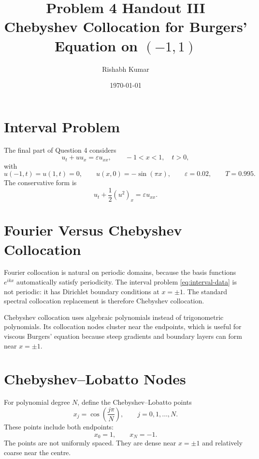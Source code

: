 \documentclass[11pt]{article}
\title{Problem 4 Handout III\\Chebyshev Collocation for Burgers' Equation on $(-1,1)$}
\author{Rishabh Kumar}
\date{\today}
\begin{document}
\maketitle

\section{Interval Problem}

The final part of Question 4 considers
\begin{equation}
    u_t+u u_x=\varepsilon u_{xx},
    \qquad -1<x<1,\quad t>0,
    \label{eq:burgers}
\end{equation}
with
\begin{equation}
    u(-1,t)=u(1,t)=0,
    \qquad
    u(x,0)=-\sin(\pi x),
    \qquad
    \varepsilon=0.02,
    \qquad
    T=0.995.
    \label{eq:interval-data}
\end{equation}
The conservative form is
\begin{equation}
    u_t+\frac12(u^2)_x=\varepsilon u_{xx}.
    \label{eq:conservative}
\end{equation}

\section{Fourier Versus Chebyshev Collocation}

Fourier collocation is natural on periodic domains, because the basis functions
$e^{ikx}$ automatically satisfy periodicity.  The interval problem \eqref{eq:interval-data}
is not periodic: it has Dirichlet boundary conditions at $x=\pm1$.  The standard
spectral collocation replacement is therefore Chebyshev collocation.

Chebyshev collocation uses algebraic polynomials instead of trigonometric
polynomials.  Its collocation nodes cluster near the endpoints, which is useful for
viscous Burgers' equation because steep gradients and boundary layers can form near
$x=\pm1$.

\section{Chebyshev--Lobatto Nodes}

For polynomial degree $N$, define the Chebyshev--Lobatto points
\begin{equation}
    x_j=\cos\left(\frac{j\pi}{N}\right),
    \qquad
    j=0,1,\ldots,N.
    \label{eq:lobatto}
\end{equation}
These points include both endpoints:
\begin{equation}
    x_0=1,
    \qquad
    x_N=-1.
\end{equation}
The points are not uniformly spaced.  They are dense near $x=\pm1$ and relatively
coarse near the centre.
\end{document}
